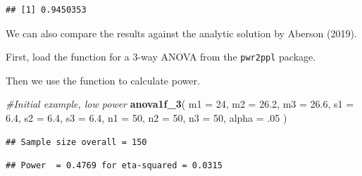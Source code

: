 \documentclass[]{book}
\newenvironment{Shaded}{\begin{snugshade}}{\end{snugshade}}
\newcommand{\CommentTok}[1]{\textcolor[rgb]{0.56,0.35,0.01}{\textit{#1}}}
\newcommand{\DataTypeTok}[1]{\textcolor[rgb]{0.13,0.29,0.53}{#1}}
\newcommand{\DecValTok}[1]{\textcolor[rgb]{0.00,0.00,0.81}{#1}}
\newcommand{\FloatTok}[1]{\textcolor[rgb]{0.00,0.00,0.81}{#1}}
\newcommand{\KeywordTok}[1]{\textcolor[rgb]{0.13,0.29,0.53}{\textbf{#1}}}
\newcommand{\NormalTok}[1]{#1}
\begin{document}
\begin{verbatim}
## [1] 0.9450353
\end{verbatim}

We can also compare the results against the analytic solution by Aberson (2019).

First, load the function for a 3-way ANOVA from the \texttt{pwr2ppl} package.

Then we use the function to calculate power.

\begin{Shaded}
\begin{Highlighting}[]
\CommentTok{#Initial example, low power}
\KeywordTok{anova1f_3}\NormalTok{(}
\DataTypeTok{m1 =} \DecValTok{24}\NormalTok{,}
\DataTypeTok{m2 =} \FloatTok{26.2}\NormalTok{,}
\DataTypeTok{m3 =} \FloatTok{26.6}\NormalTok{,}
\DataTypeTok{s1 =} \FloatTok{6.4}\NormalTok{,}
\DataTypeTok{s2 =} \FloatTok{6.4}\NormalTok{,}
\DataTypeTok{s3 =} \FloatTok{6.4}\NormalTok{,}
\DataTypeTok{n1 =} \DecValTok{50}\NormalTok{,}
\DataTypeTok{n2 =} \DecValTok{50}\NormalTok{,}
\DataTypeTok{n3 =} \DecValTok{50}\NormalTok{,}
\DataTypeTok{alpha =} \FloatTok{.05}
\NormalTok{)}
\end{Highlighting}
\end{Shaded}

\begin{verbatim}
## Sample size overall = 150
\end{verbatim}

\begin{verbatim}
## Power  = 0.4769 for eta-squared = 0.0315
\end{verbatim}

\begin{Shaded}
\end{Shaded}
\end{document}
